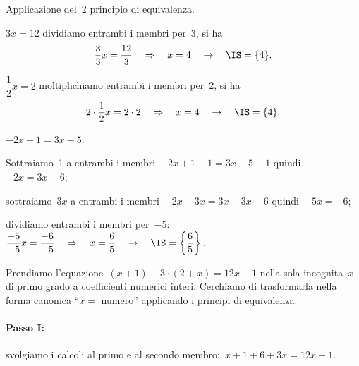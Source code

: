\ovalbox{\risolvii \ref{ese:13.2}, \ref{ese:13.3}, \ref{ese:13.4}, \ref{ese:13.5}}
\begin{exrig}
 \begin{esempio}
 Applicazione del~2{\textdegree} principio di equivalenza.

 \begin{enumeratea}
\item $3x=12$ dividiamo entrambi i membri per~3, si ha
\[\dfrac{3}{3}x=\dfrac{12}{3}\quad\Rightarrow\quad x=4\quad\to\quad\IS =\{4\}.\]
\item $\dfrac{1}{2}x=2$ moltiplichiamo entrambi i membri per~2, si ha
\[2\cdot {\dfrac{1}{2}}x=2\cdot 2\quad\Rightarrow\quad x=4\quad\to\quad\IS =\{4\}.\]
\end{enumeratea}
\end{esempio}
\end{exrig}

\ovalbox{\risolvii \ref{ese:13.6}, \ref{ese:13.7}, \ref{ese:13.8}}

 \begin{exrig}
 \begin{esempio}
 $-2x+1=3x-5$.

\begin{enumeratea}
 \item Sottraiamo~1 a entrambi i membri~$-2x+1-1=3x-5-1$ quindi~$-2x=3x-6$;
\item sottraiamo~$3x$ a entrambi i membri~$-2x-3x=3x-3x-6$ quindi~$-5x=-6$;
\item dividiamo entrambi i membri per~$-5$:~$\dfrac{-5}{-5}x=\dfrac{-6}{-5}\quad\Rightarrow\quad x=\dfrac{6}{5}\quad\rightarrow\quad
\IS =\left\{\dfrac{6}{5}\right\}.$
\end{enumeratea}
 \end{esempio}
 \end{exrig}

\ovalbox{\risolvii \ref{ese:13.9}, \ref{ese:13.10}, \ref{ese:13.11}}
\begin{exrig}
 \begin{esempio}
Prendiamo l'equazione~$(x+1)+3\cdot (2+x)=12x-1$ nella
sola incognita~$x$ di primo grado a coefficienti numerici interi.
Cerchiamo di trasformarla nella forma canonica ``$x =$
numero'' applicando i principi di equivalenza.
 \end{esempio}
\end{exrig}

\paragraph{Passo I:} svolgiamo i calcoli al primo e al secondo
membro:~$x+1+6+3x=12x-1$.

